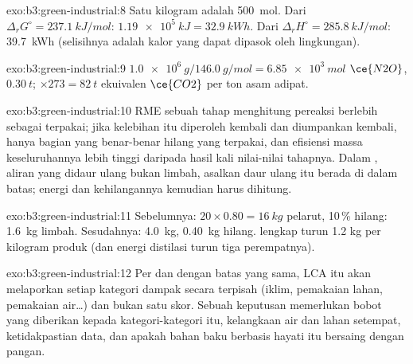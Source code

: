 \begin{solution}{exo:b3:green-industrial:8}
Satu kilogram adalah \qty{500}{mol}. Dari $\Delta_rG^\circ = \qty{237.1}{kJ/mol}$: $\qty{1.19e5}{kJ} = \qty{32.9}{kWh}$. Dari $\Delta_rH^\circ = \qty{285.8}{kJ/mol}$: \qty{39.7}{kWh}
(selisihnya adalah kalor yang dapat dipasok oleh lingkungan).
\end{solution}

\begin{solution}{exo:b3:green-industrial:9}
$\qty{1.0e6}{g}/\qty{146.0}{g/mol} = \qty{6.85e3}{mol}$ $\ce{N2O}$, $\qty{0.30}{t}$; $\times 273 = \qty{82}{t}$ ekuivalen $\ce{CO2}$ per ton asam adipat.
\end{solution}

\begin{solution}{exo:b3:green-industrial:10}
RME sebuah tahap menghitung pereaksi berlebih sebagai terpakai; jika kelebihan itu diperoleh kembali
dan diumpankan kembali, hanya bagian yang benar-benar hilang yang terpakai, dan efisiensi massa
keseluruhannya lebih tinggi daripada hasil kali nilai-nilai tahapnya. Dalam , aliran
yang didaur ulang bukan limbah, asalkan daur ulang itu berada di dalam batas;
energi dan kehilangannya kemudian harus dihitung.
\end{solution}

\begin{solution}{exo:b3:green-industrial:11}
Sebelumnya: $20 \times 0.80 = \qty{16}{kg}$ pelarut, 10\,\% hilang: \qty{1.6}{kg} limbah. Sesudahnya: \qty{4.0}{kg}, \qty{0.40}{kg} hilang.
 lengkap turun 1.2 kg per kilogram produk (dan energi distilasi
turun tiga perempatnya).
\end{solution}

\begin{solution}{exo:b3:green-industrial:12}
Per  dan dengan batas yang sama, LCA itu akan melaporkan setiap kategori
dampak secara terpisah (iklim, pemakaian lahan, pemakaian air\dots) dan bukan satu skor. Sebuah
keputusan memerlukan bobot yang diberikan kepada kategori-kategori itu, kelangkaan air
dan lahan setempat, ketidakpastian data, dan apakah bahan baku berbasis hayati itu
bersaing dengan pangan.
\end{solution}

